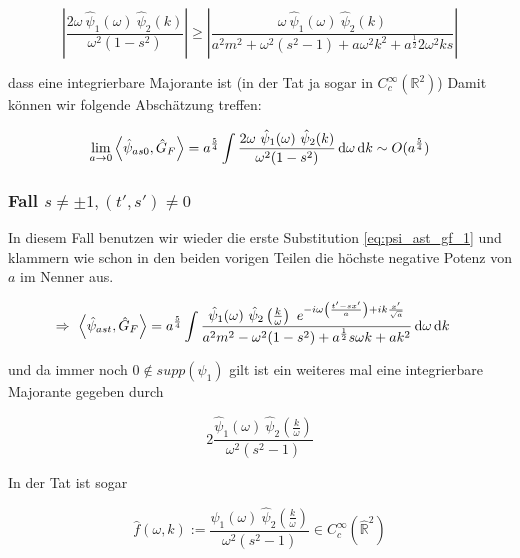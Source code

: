 \documentclass{scrartcl}
\begin{document}

\begin{equation*}
    \left|
        \frac{2 \omega ~\hat \psi_1(\omega) ~\hat \psi_2(k)}{\omega^2 (1-s^2)}
    \right|
    \geq
    \left|
        \frac{
        \omega ~\hat \psi_1(\omega) ~\hat \psi_2(k)
    }
    {
        a^2 m^2+\omega^2 (s^2-1) + a \omega^2 k^2 + a^\frac{1}{2}2 \omega^2 k s
    }
    \right|
\end{equation*}

dass eine integrierbare Majorante ist (in der Tat ja sogar in $C_c^\infty (\mathbb{R}^2)$)
Damit können wir folgende Abschätzung treffen:

\begin{equation*}
    \lim_{a \rightarrow 0} \left< \hat\psi_{as0}, \hat G_F \right> =
    a^\frac{5}{4} \int \frac{2 \omega ~\hat \psi_1(\omega) ~\hat \psi_2(k)}
    {\omega^2 (1-s^2)}
    \mathop{}\!\mathrm{d} \omega \mathop{}\!\mathrm{d} k
    \sim O(a^\frac{5}{4})
\end{equation*}


\subsubsection*{Fall $s \neq \pm 1, (t', s') \neq 0$}
In diesem Fall benutzen wir wieder die erste Substitution \eqref{eq:psi_ast_gf_1}
und klammern wie schon in den beiden vorigen Teilen die höchste negative
Potenz von $a$ im Nenner aus.

\begin{align}
\Rightarrow ~
    \left< \hat\psi_{ast}, \hat G_F \right>
    &=
    a^\frac{5}{4} \int \frac{
        \hat \psi_1 (\omega) ~\hat \psi_2 \left(\frac{k}{\omega}\right)
        ~ e^{-i \omega \left(\frac{t'-sx'}{a}\right) + i k \frac{x'}{\sqrt{a}}}
    }
    {
        a^2 m^2 - \omega^2 (1-s^2) + a^\frac{1}{2} s \omega k +a k^2
    }
    \mathop{}\!\mathrm{d} \omega \mathop{}\!\mathrm{d} k
\end{align}

und da immer noch $0 \notin supp(\psi_1)$ gilt ist ein weiteres mal eine integrierbare Majorante gegeben durch

\begin{equation}
    2\frac{\hat \psi_1 (\omega)~\hat\psi_2 \left(\frac{k}{\omega}\right)}
    {\omega^2(s^2-1)}
\end{equation}

In der Tat ist sogar

\begin{equation}
    \hat f(\omega, k) := \frac{\hat \psi_1 (\omega)~\hat\psi_2 \left(\frac{k}{\omega}\right)}
    {\omega^2(s^2-1)}
    \in C_c^\infty (\hat{\mathbb{R}}^2)
\end{equation}
\end{document}
